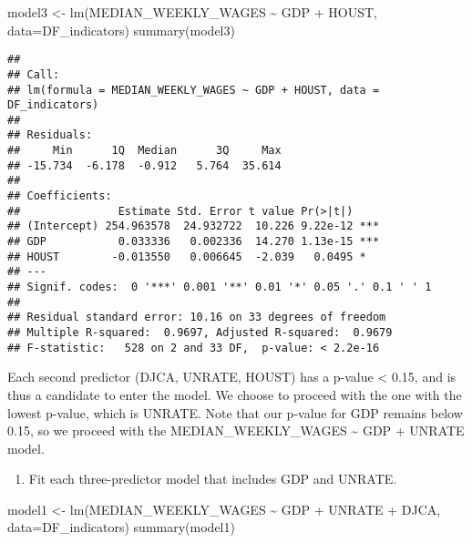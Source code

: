 \documentclass[
]{article}
\newenvironment{Shaded}{\begin{snugshade}}{\end{snugshade}}
\newcommand{\AttributeTok}[1]{\textcolor[rgb]{0.77,0.63,0.00}{#1}}
\newcommand{\FunctionTok}[1]{\textcolor[rgb]{0.00,0.00,0.00}{#1}}
\newcommand{\NormalTok}[1]{#1}
\newcommand{\OtherTok}[1]{\textcolor[rgb]{0.56,0.35,0.01}{#1}}
\newcommand{\SpecialCharTok}[1]{\textcolor[rgb]{0.00,0.00,0.00}{#1}}
\providecommand{\tightlist}{%
  \setlength{\itemsep}{0pt}\setlength{\parskip}{0pt}}
\begin{document}
\begin{Shaded}
\begin{Highlighting}[]
\NormalTok{model3 }\OtherTok{\textless{}{-}} \FunctionTok{lm}\NormalTok{(MEDIAN\_WEEKLY\_WAGES }\SpecialCharTok{\textasciitilde{}}\NormalTok{ GDP }\SpecialCharTok{+}\NormalTok{ HOUST, }\AttributeTok{data=}\NormalTok{DF\_indicators)}
\FunctionTok{summary}\NormalTok{(model3)}
\end{Highlighting}
\end{Shaded}

\begin{verbatim}
## 
## Call:
## lm(formula = MEDIAN_WEEKLY_WAGES ~ GDP + HOUST, data = DF_indicators)
## 
## Residuals:
##     Min      1Q  Median      3Q     Max 
## -15.734  -6.178  -0.912   5.764  35.614 
## 
## Coefficients:
##               Estimate Std. Error t value Pr(>|t|)    
## (Intercept) 254.963578  24.932722  10.226 9.22e-12 ***
## GDP           0.033336   0.002336  14.270 1.13e-15 ***
## HOUST        -0.013550   0.006645  -2.039   0.0495 *  
## ---
## Signif. codes:  0 '***' 0.001 '**' 0.01 '*' 0.05 '.' 0.1 ' ' 1
## 
## Residual standard error: 10.16 on 33 degrees of freedom
## Multiple R-squared:  0.9697, Adjusted R-squared:  0.9679 
## F-statistic:   528 on 2 and 33 DF,  p-value: < 2.2e-16
\end{verbatim}

Each second predictor (DJCA, UNRATE, HOUST) has a p-value \textless{}
0.15, and is thus a candidate to enter the model. We choose to proceed
with the one with the lowest p-value, which is UNRATE. Note that our
p-value for GDP remains below 0.15, so we proceed with the
MEDIAN\_WEEKLY\_WAGES \textasciitilde{} GDP + UNRATE model.

\begin{enumerate}
\def\labelenumi{\arabic{enumi}.}
\setcounter{enumi}{2}
\tightlist
\item
  Fit each three-predictor model that includes GDP and UNRATE.
\end{enumerate}

\begin{Shaded}
\begin{Highlighting}[]
\NormalTok{model1 }\OtherTok{\textless{}{-}} \FunctionTok{lm}\NormalTok{(MEDIAN\_WEEKLY\_WAGES }\SpecialCharTok{\textasciitilde{}}\NormalTok{ GDP }\SpecialCharTok{+}\NormalTok{ UNRATE }\SpecialCharTok{+}\NormalTok{ DJCA, }\AttributeTok{data=}\NormalTok{DF\_indicators)}
\FunctionTok{summary}\NormalTok{(model1)}
\end{Highlighting}
\end{Shaded}
\end{document}

